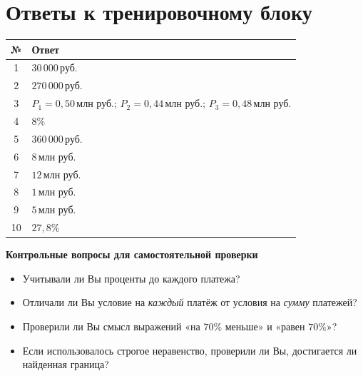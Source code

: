 \documentclass[a4paper,12pt]{article}
\newcommand{\key}[1]{\textcolor{darkaccent}{\textbf{#1}}}
\newcommand{\mln}{\,\text{млн руб.}}
\newcommand{\rub}{\,\text{руб.}}
\begin{document}
\clearpage
\section*{Ответы к тренировочному блоку}
\begin{center}
\renewcommand{\arraystretch}{1.65}
\begin{tabularx}{\linewidth}{@{}c >{\raggedright\arraybackslash}X@{}}
\toprule
№ & Ответ \\
\midrule
1 & $30\,000\rub$ \\
2 & $270\,000\rub$ \\
3 & $P_1=0{,}50\mln$; $P_2=0{,}44\mln$; $P_3=0{,}48\mln$ \\
4 & $8\%$ \\
5 & $360\,000\rub$ \\
6 & $8\mln$ \\
7 & $12\mln$ \\
8 & $1\mln$ \\
9 & $5\mln$ \\
10 & $27{,}8\%$ \\
\bottomrule
\end{tabularx}
\end{center}

\vspace{7mm}
\key{Контрольные вопросы для самостоятельной проверки}
\begin{itemize}
\item Учитывали ли Вы проценты до каждого платежа?
\item Отличали ли Вы условие на \emph{каждый} платёж от условия на \emph{сумму} платежей?
\item Проверили ли Вы смысл выражений «на $70\%$ меньше» и «равен $70\%$»?
\item Если использовалось строгое неравенство, проверили ли Вы, достигается ли найденная граница?
\end{itemize}
\end{document}

